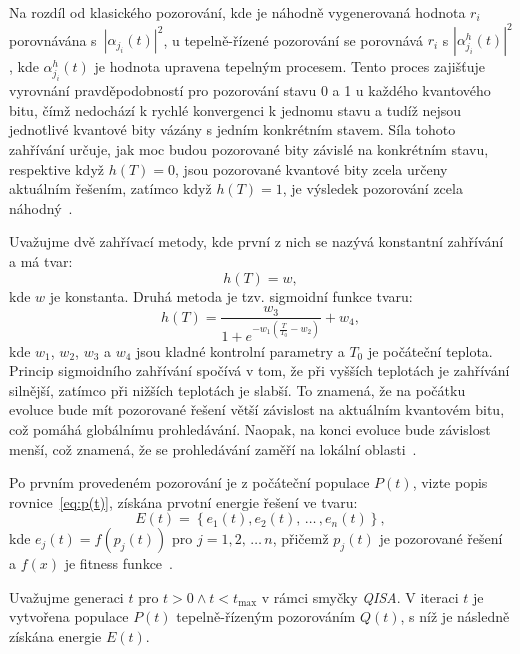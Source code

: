Na rozdíl od klasického pozorování, kde je náhodně vygenerovaná hodnota $r_i$ porovnávána s~$\left|\alpha_{j_i}\left(t\right) \right|^2$, u tepelně-řízené pozorování se porovnává $r_i$ s $\left|\alpha_{j_i}^h\left(t\right) \right|^2$, kde $\alpha_{j_i}^h\left(t\right)$ je hodnota upravena tepelným procesem.
Tento proces zajišťuje vyrovnání pravděpodobností pro pozorování stavu 0 a 1 u každého kvantového bitu, čímž nedochází k rychlé konvergenci k jednomu stavu a tudíž nejsou jednotlivé kvantové bity vázány s jedním konkrétním stavem. 
Síla tohoto zahřívání určuje, jak moc budou pozorované bity závislé na konkrétním stavu, respektive když $h\left(T\right) = 0$, jsou pozorované kvantové bity zcela určeny aktuálním řešením, zatímco když $h\left(T\right) = 1$, je výsledek pozorování zcela náhodný~\cite{qisa}. 

Uvažujme dvě zahřívací metody, kde první z nich se nazývá konstantní zahřívání a má tvar:
\begin{equation*}
    h\left(T\right) = w,
\end{equation*}
kde $w$ je konstanta. Druhá metoda je tzv. sigmoidní funkce tvaru:
\begin{equation*}
    h\left(T\right) = \frac{w_3}{1 + e^{-w_1 \left(\frac{T}{T_0} - w_2 \right)}} + w_4,
\end{equation*}
kde $w_1$, $w_2$, $w_3$ a $w_4$ jsou kladné kontrolní parametry a $T_0$ je počáteční teplota. 
Princip sigmoidního zahřívání spočívá v tom, že při vyšších teplotách je zahřívání silnější, zatímco při nižších teplotách je slabší.
To znamená, že na počátku evoluce bude mít pozorované řešení větší závislost na aktuálním kvantovém bitu, což pomáhá globálnímu prohledávání. Naopak, na konci evoluce bude závislost menší, což znamená, že se prohledávání zaměří na lokální oblasti~\cite{qisa}. 

Po prvním provedeném pozorování je z počáteční populace $P\left(t\right)$, vizte popis rovnice~\ref{eq:p(t)}, získána prvotní energie řešení ve tvaru:
\begin{equation*}
    E(t) = \left\{ e_1\left(t\right), e_2\left(t\right),\,\dots\,, e_n\left(t\right) \right\},
\end{equation*}
kde $e_j \left( t \right) = f\left( p_j \left( t \right) \right)$ pro $j = 1,2,\,\dots\,n$, přičemž $p_j\left( t \right)$ je pozorované řešení a $f\left( x \right)$ je fitness funkce~\cite{qisa}.

Uvažujme generaci $t$ pro $t>0 \wedge t < t_{\text{max}}$ v rámci smyčky \emph{QISA}. 
V iteraci $t$ je vytvořena populace $P\left(t\right)$ tepelně-řízeným pozorováním $Q\left(t\right)$, s níž je následně získána energie $E\left(t\right)$.

